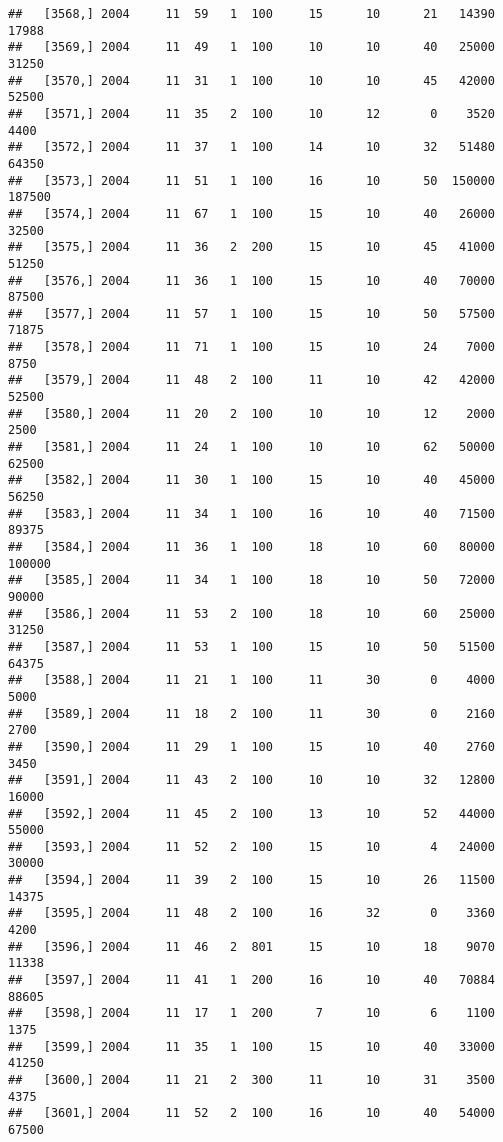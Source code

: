 \documentclass{article}\usepackage[]{graphicx}\usepackage[]{color}
\makeatletter
\newenvironment{kframe}{%
 \def\at@end@of@kframe{}%
 \ifinner\ifhmode%
  \def\at@end@of@kframe{\end{minipage}}%
  \begin{minipage}{\columnwidth}%
 \fi\fi%
 \def\FrameCommand##1{\hskip\@totalleftmargin \hskip-\fboxsep
 \colorbox{shadecolor}{##1}\hskip-\fboxsep
     \hskip-\linewidth \hskip-\@totalleftmargin \hskip\columnwidth}%
 \MakeFramed {\advance\hsize-\width
   \@totalleftmargin\z@ \linewidth\hsize
   \@setminipage}}%
 {\par\unskip\endMakeFramed%
 \at@end@of@kframe}
\newenvironment{knitrout}{}{} %
\makeatother
\begin{document}
\begin{knitrout}
\begin{kframe}
\begin{verbatim}
##   [3568,] 2004     11  59   1  100     15      10      21   14390   17988
##   [3569,] 2004     11  49   1  100     10      10      40   25000   31250
##   [3570,] 2004     11  31   1  100     10      10      45   42000   52500
##   [3571,] 2004     11  35   2  100     10      12       0    3520    4400
##   [3572,] 2004     11  37   1  100     14      10      32   51480   64350
##   [3573,] 2004     11  51   1  100     16      10      50  150000  187500
##   [3574,] 2004     11  67   1  100     15      10      40   26000   32500
##   [3575,] 2004     11  36   2  200     15      10      45   41000   51250
##   [3576,] 2004     11  36   1  100     15      10      40   70000   87500
##   [3577,] 2004     11  57   1  100     15      10      50   57500   71875
##   [3578,] 2004     11  71   1  100     15      10      24    7000    8750
##   [3579,] 2004     11  48   2  100     11      10      42   42000   52500
##   [3580,] 2004     11  20   2  100     10      10      12    2000    2500
##   [3581,] 2004     11  24   1  100     10      10      62   50000   62500
##   [3582,] 2004     11  30   1  100     15      10      40   45000   56250
##   [3583,] 2004     11  34   1  100     16      10      40   71500   89375
##   [3584,] 2004     11  36   1  100     18      10      60   80000  100000
##   [3585,] 2004     11  34   1  100     18      10      50   72000   90000
##   [3586,] 2004     11  53   2  100     18      10      60   25000   31250
##   [3587,] 2004     11  53   1  100     15      10      50   51500   64375
##   [3588,] 2004     11  21   1  100     11      30       0    4000    5000
##   [3589,] 2004     11  18   2  100     11      30       0    2160    2700
##   [3590,] 2004     11  29   1  100     15      10      40    2760    3450
##   [3591,] 2004     11  43   2  100     10      10      32   12800   16000
##   [3592,] 2004     11  45   2  100     13      10      52   44000   55000
##   [3593,] 2004     11  52   2  100     15      10       4   24000   30000
##   [3594,] 2004     11  39   2  100     15      10      26   11500   14375
##   [3595,] 2004     11  48   2  100     16      32       0    3360    4200
##   [3596,] 2004     11  46   2  801     15      10      18    9070   11338
##   [3597,] 2004     11  41   1  200     16      10      40   70884   88605
##   [3598,] 2004     11  17   1  200      7      10       6    1100    1375
##   [3599,] 2004     11  35   1  100     15      10      40   33000   41250
##   [3600,] 2004     11  21   2  300     11      10      31    3500    4375
##   [3601,] 2004     11  52   2  100     16      10      40   54000   67500

\end{verbatim}
\end{kframe}
\end{knitrout}
\end{document}
